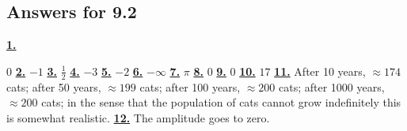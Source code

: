 \subsection *{Answers for 9.2}
\hypertarget {a:9.2.1}{\hyperlink {e:9.2.1}{\bfseries 1.}} \mdseries $0$\qquad 
\hypertarget {a:9.2.2}{\hyperlink {e:9.2.2}{\bfseries 2.}} \mdseries $-1$\qquad 
\hypertarget {a:9.2.3}{\hyperlink {e:9.2.3}{\bfseries 3.}} \mdseries $\frac {1}{2}$\qquad 
\hypertarget {a:9.2.4}{\hyperlink {e:9.2.4}{\bfseries 4.}} \mdseries $-3$\qquad 
\hypertarget {a:9.2.5}{\hyperlink {e:9.2.5}{\bfseries 5.}} \mdseries $-2$\qquad 
\hypertarget {a:9.2.6}{\hyperlink {e:9.2.6}{\bfseries 6.}} \mdseries $-\infty $\qquad 
\hypertarget {a:9.2.7}{\hyperlink {e:9.2.7}{\bfseries 7.}} \mdseries $\pi $\qquad 
\hypertarget {a:9.2.8}{\hyperlink {e:9.2.8}{\bfseries 8.}} \mdseries $0$\qquad 
\hypertarget {a:9.2.9}{\hyperlink {e:9.2.9}{\bfseries 9.}} \mdseries $0$\qquad 
\hypertarget {a:9.2.10}{\hyperlink {e:9.2.10}{\bfseries 10.}} \mdseries $17$\qquad 
\hypertarget {a:9.2.11}{\hyperlink {e:9.2.11}{\bfseries 11.}} \mdseries After 10 years, $\approx 174$ cats; after 50 years, $\approx 199$ cats; after 100 years, $\approx 200$ cats; after 1000 years, $\approx 200$ cats; in the sense that the population of cats cannot grow indefinitely this is somewhat realistic.\qquad 
\hypertarget {a:9.2.12}{\hyperlink {e:9.2.12}{\bfseries 12.}} \mdseries The amplitude goes to zero.\qquad 
